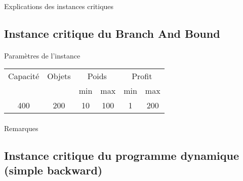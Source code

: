 \documentclass[12pt]{article}
\begin{document}
\paragraph{}Explications des instances critiques

\subsection{Instance critique du Branch And Bound}

\paragraph{}Paramètres de l'instance

\begin{tabular}{|c|c|c|c|c|c|}
	\hline
	Capacité & Objets & \multicolumn{2}{c|}{Poids} & \multicolumn{2}{c|}{Profit} \\
	\cline{3-6}
		& & min & max & min & max \\
	\hline
	400 & 200 & 10 & 100 & 1 & 200 \\
	\hline
\end{tabular}

\begin{figure}[!h]
\begin{floatrow}
\end{floatrow}
\end{figure}

\paragraph{}Remarques

\subsection{Instance critique du programme dynamique (simple backward)}
\end{document}
